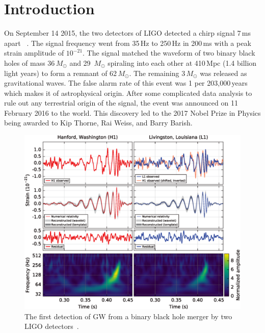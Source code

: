 \documentclass{ttuthes2007}
\begin{document}

\mainmatter


\chapter{\textbf{Introduction}}
    On September 14 2015, the two detectors of \ac{LIGO} detected a chirp
signal 7\,ms apart ~\cite{Abbott_2016}. The signal frequency went from 35\,Hz to 250\,Hz in 200\,ms with a peak strain amplitude of $10^{-21}$.  The signal
matched the waveform of two binary black holes of mass 36\,$M_\odot$ and 29\,
$M_\odot$ spiraling into each other at 410\,Mpc (1.4 billion light years) to
form a remnant of 62\,$M_\odot$. The remaining 3\,$M_\odot$ was released as
gravitational waves.  The false alarm rate of this event was 1 per 203,000\,years
which makes it of astrophysical origin.  After some complicated data analysis
to rule out any terrestrial origin of the signal, the event was announced on 11
February 2016 to the world. This discovery led to the 2017 Nobel Prize in
Physics being awarded to Kip Thorne, Rai Weiss, and Barry Barish.
\begin{figure}[bht!]                                                              
        \includegraphics[width=\textwidth]{figure/BBH.png}                          
	\caption{The first detection of \ac{GW} from a binary black hole
merger by two \ac{LIGO} detectors~\cite{Abbott_2016}.}
\end{figure}      
\end{document}
